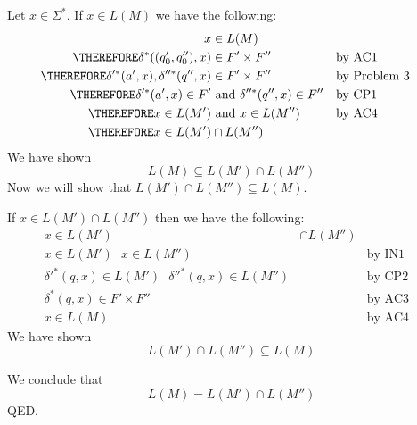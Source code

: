Let $x \in \Sigma^*$.
If $x\in L(M)$ we have the following:
\begin{align*}
           x &\in L(M)                                                  \\
\THEREFORE \delta^*((q'_0,q''_0), x) &\in F' \times F'' & & \text{by AC1} \\
\THEREFORE \delta'^*(a',x),\delta''^*(q'',x) &\in F' \times F''                         & & \text{by Problem 3} \\
\THEREFORE \delta'^*(a',x) \in F' &\text{ and } \delta''^*(q'',x) \in F''             & & \text{by CP1} \\
\THEREFORE x \in L(M') &\text{ and } x \in L(M'')       & & \text{by AC4} \\
\THEREFORE x \in L(M') &\cap L(M'') 
\end{align*}
We have shown
\[
L(M) \subseteq L(M') \cap L(M'')
\]
Now we will show that $L(M') \cap L(M'') \subseteq L(M)$. 

If $x \in L(M') \cap L(M'')$ then we have the following:
\begin{align*}
x \in L(M') &\cap L(M'')                                 & & \\
x \in L(M')\text{ }x \in L(M'')                          & & \text{by IN1} \\
\delta'^*(q,x)\in L(M')\text{ }\delta''^*(q,x)\in L(M'') & & \text{by CP2} \\
\delta^*(q,x)\in F'\times F''                            & & \text{by AC3} \\
x\in L(M)                                                & & \text{by AC4}
\end{align*}
We have shown 
\[
L(M') \cap L(M'') \subseteq L(M)
\]

We conclude that
\[
L(M) = L(M') \cap L(M'')
\]
QED.
\\


